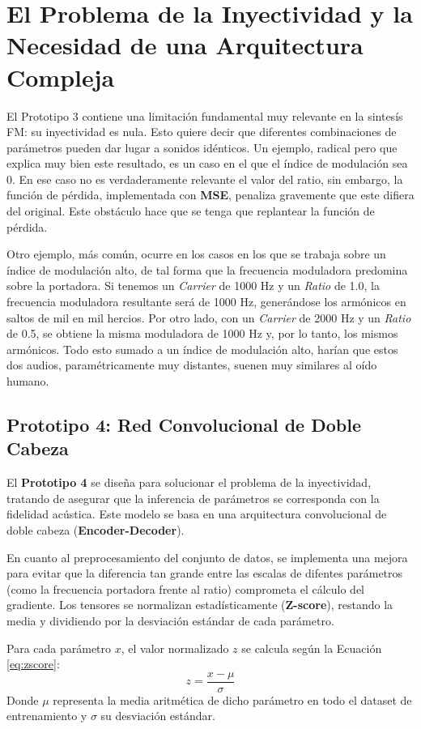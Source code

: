 \section{El Problema de la Inyectividad y la Necesidad de una Arquitectura Compleja}
El Prototipo 3 contiene una limitación fundamental muy relevante en la sintesís FM:
su inyectividad es nula. Esto quiere decir que diferentes combinaciones de parámetros pueden dar lugar
a sonidos idénticos. Un ejemplo, radical pero que explica muy bien este resultado, es un caso en el que
el índice de modulación sea 0. En ese caso no es verdaderamente relevante el valor del ratio, sin embargo, 
la función de pérdida, implementada con \textbf{MSE}, penaliza gravemente que este difiera del original. 
Este obstáculo hace que se tenga que replantear la función de pérdida.

Otro ejemplo, más común, ocurre en los casos en los que se trabaja sobre un índice de modulación alto, de tal forma que la frecuencia moduladora predomina sobre la portadora. Si tenemos un \textit{Carrier} de 1000 Hz y un \textit{Ratio} de 1.0, la frecuencia moduladora resultante será de 1000 Hz, generándose los armónicos en saltos de mil en mil hercios. Por otro lado, con un \textit{Carrier} de 2000 Hz y un \textit{Ratio} de 0.5, se obtiene la misma moduladora de 1000 Hz y, por lo tanto, los mismos armónicos. Todo esto sumado a un índice de modulación alto, harían que estos dos audios, paramétricamente muy distantes, suenen muy similares al oído humano. 

\subsection{Prototipo 4: Red Convolucional de Doble Cabeza}
El \textbf{Prototipo 4} se diseña para solucionar el problema de la inyectividad, tratando de asegurar
que la inferencia de parámetros se corresponda con la fidelidad acústica. Este modelo se basa en una 
arquitectura convolucional de doble cabeza (\textbf{Encoder-Decoder}).

En cuanto al preprocesamiento del conjunto de datos, se implementa una mejora para evitar que la diferencia 
tan grande entre las escalas de difentes parámetros (como la frecuencia portadora frente al ratio) comprometa
el cálculo del gradiente. Los tensores se normalizan estadísticamente (\textbf{Z-score}), restando la media y 
dividiendo por la desviación estándar de cada parámetro. 

Para cada parámetro $x$, el valor normalizado $z$ se calcula según la Ecuación \ref{eq:zscore}:
\begin{equation}
z = \frac{x - \mu}{\sigma}
\label{eq:zscore}
\end{equation}
Donde $\mu$ representa la media aritmética de dicho parámetro en todo el dataset de entrenamiento y $\sigma$ su desviación estándar.

